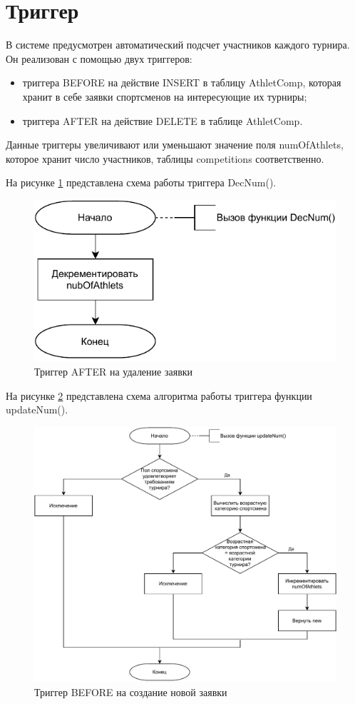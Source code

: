 \section{Триггер}

В системе предусмотрен автоматический подсчет участников каждого турнира. Он реализован с помощью двух триггеров:

\begin{itemize}
	\item триггера BEFORE на действие INSERT в таблицу AthletComp, которая хранит в себе заявки спортсменов на интересующие их турниры;
	\item триггера AFTER на действие DELETE в таблице AthletComp.
\end{itemize}

Данные триггеры увеличивают или уменьшают значение поля numOfAthlets, которое хранит число участников, таблицы competitions соответственно.

На рисунке \ref{ris:trigger-delete} представлена схема работы триггера DecNum().

\begin{figure}[H]
	\includegraphics[width=0.5\columnwidth]{assets/trigger-delete.pdf}
	\centering
	\caption{Триггер AFTER на удаление заявки}
	\label{ris:trigger-delete}
\end{figure}

На рисунке \ref{ris:trigger-insert} представлена схема алгоритма работы триггера функции updateNum().

\begin{figure}[H]
		\includegraphics[width=0.8\columnwidth]{assets/trigger-insert.pdf}
	\centering
	\caption{Триггер BEFORE на создание новой заявки}
	\label{ris:trigger-insert}
\end{figure}

